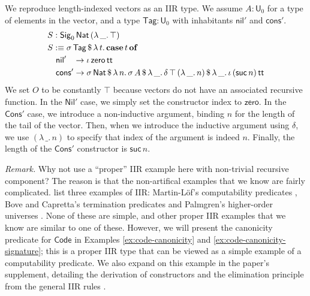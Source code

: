 \documentclass[acmsmall,screen,review]{acmart}
\newcommand{\msf}[1]{{\mathsf{#1}}}
\newcommand{\mbf}[1]{{\mathbf{#1}}}
\newcommand{\U}{\msf{U}}
\newcommand{\Nat}{\msf{Nat}}
\newcommand{\zero}{\msf{zero}}
\newcommand{\suc}{\msf{suc}}
\newcommand{\Nil}{\msf{Nil}}
\newcommand{\Cons}{\msf{Cons}}
\newcommand{\Sig}{\msf{Sig}}
\newcommand{\Code}{\msf{Code}}
\newcommand{\Tag}{\msf{Tag}}
\newcommand{\case}{\mbf{case}}
\newcommand{\of}{\mbf{of}}
\newcommand{\ttt}{\msf{tt}}
\newcommand{\nil}{\msf{nil}}
\newcommand{\cons}{\msf{cons}}
\begin{document}
\begin{example}\label{ex:vector} We reproduce length-indexed vectors as an IIR type. We assume $A : \U_0$ for a type of elements in the vector,
and a type $\Tag : \U_0$ with inhabitants $\nil'$ and $\cons'$.
\begin{alignat*}{4}
  & S : \Sig_0\,\Nat\,(\lambda\,\_.\,\top)\\
  & S :\equiv \sigma\,\Tag\,\$\,\lambda\,t.\,\case\,t\,\of \\
  & \quad \nil'\hspace{0.85em} \to \iota\,\zero\,\ttt \\
  & \quad \cons'\to \sigma\,\Nat\,\$\,\lambda\,n.\,\sigma\,A\,\$\,\lambda\,\_.\,\delta\,\top\,(\lambda\,\_.\,n)\,\$\,\lambda\,\_.\,\iota\,(\suc\,n)\,\ttt
\end{alignat*}
We set $O$ to be constantly $\top$ because vectors do not have an associated recursive function. In
the $\Nil'$ case, we simply set the constructor index to $\zero$. In the $\Cons'$ case, we introduce
a non-inductive argument, binding $n$ for the length of the tail of the vector. Then, when we
introduce the inductive argument using $\delta$, we use $(\lambda\,\_.\,n)$ to specify that index of
the argument is indeed $n$. Finally, the length of the $\Cons'$ constructor is $\suc\,n$.

\emph{Remark.} Why not use a ``proper'' IIR example here with non-trivial recursive component? The
reason is that the non-artifical examples that we know are fairly
complicated. \citet{DBLP:journals/jlp/DybjerS06} list three examples of IIR: Martin-Löf's
computability predicates \cite{martinlof84sambin}, Bove and Capretta's termination predicates
\cite{DBLP:conf/tphol/BoveC01} and Palmgren's higher-order universes
\cite{Palmgren98onuniverses}. None of these are simple, and other proper IIR examples that we know
are similar to one of these. However, we will present the canonicity predicate for $\Code$ in
Examples \ref{ex:code-canonicity} and \ref{ex:code-canonicity-signature}; this is a proper IIR type
that can be viewed as a simple example of a computability predicate. We also expand on this example
in the paper's supplement, detailing the derivation of constructors and the elimination principle
from the general IIR rules \cite{TODO}.

\end{example}
\end{document}
